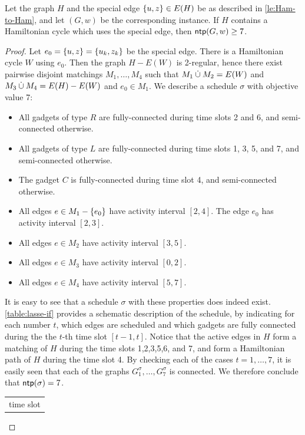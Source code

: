 \begin{lemma}
\label{lemma:lasse-if}
Let the graph $H$ and the special edge $\{ u,z \} \in E(H)$ be as described in \cref{le:Ham-to-Ham}, and let $(G, w)$ be the corresponding {\xxxNTP} instance. 
If $H$ contains a Hamiltonian cycle which uses the special edge, then $\operatorname{\textsf{ntp}}(G, w) \geq 7$.
\end{lemma}
\begin{proof}
Let $e_0 = \{ u, z \} = \{ u_k, z_k \}$ be the special edge. There is a Hamiltonian cycle $W$ using $e_0$. Then the graph $H-E(W)$ is 2-regular, hence there exist pairwise disjoint matchings $M_1, \ldots, M_4$ such that $M_1 \mathbin{\dot{\cup}} M_2 = E(W)$ and $M_3 \mathbin{\dot{\cup}} M_4 = E(H) - E(W)$ and $e_0 \in M_1$. We describe a schedule $\sigma$ with objective value 7:
\begin{itemize}
\item All gadgets of type $R$ are fully-connected during time slots 2 and 6, and semi-connected otherwise.
\item All gadgets of type $L$ are fully-connected during time slots 1, 3, 5, and 7, and semi-connected otherwise.
\item The gadget $C$ is fully-connected during time slot 4, and semi-connected otherwise.
\item All edges $e \in M_1 - \{ e_0 \}$ have activity interval $[2, 4]$. The edge $e_0$ has activity interval $[2, 3]$.
\item All edges $e \in M_2$ have activity interval $[3, 5]$.
\item All edges $e \in M_3$ have activity interval $[0, 2]$.
\item All edges $e \in M_4$ have activity interval $[5, 7]$.
\end{itemize}
It is easy to see that a schedule $\sigma$ with these properties does indeed exist. \cref{table:lasse-if} provides a schematic description of the schedule, by indicating for each number $t$, which edges are scheduled and which gadgets are fully connected during the the $t$-th time slot $[t-1, t]$.  Notice that the active edges in $H$ form a matching of $H$ during the time slots 1,2,3,5,6, and 7, 
and form a Hamiltonian path of $H$ during the time slot 4. 
By checking each of the cases $t=1,\dots,7$, it is easily seen that each of the graphs $G^\sigma_1,\ldots,G^\sigma_7$ is connected. We therefore conclude that $\operatorname{\textsf{ntp}}(\sigma) = 7$. 
\begin{table}[htpb]
\centering
 \begin{tabular}{ c | c | c | c | c | c | c } 
 \multicolumn{7}{c}{time slot}\\

\end{tabular}
\end{table}
\end{proof}
